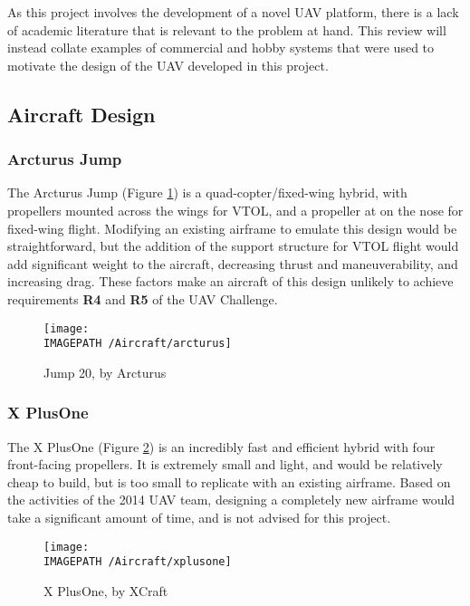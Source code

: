 As this project involves the development of a novel UAV platform, there is a lack of academic literature that is relevant to the problem at hand. This review will instead collate examples of commercial and hobby systems that were used to motivate the design of the UAV developed in this project.\\

\subsection{Aircraft Design}
\label{sec:litaircraft}
\subsubsection*{Arcturus Jump}
The Arcturus Jump\cite{ref:arcturus} (Figure \ref{fig:arcturus}) is a quad-copter/fixed-wing hybrid, with propellers mounted across the wings for VTOL, and a propeller at on the nose for fixed-wing flight. Modifying an existing airframe to emulate this design would be straightforward, but the addition of the support structure for VTOL flight would add significant weight to the aircraft, decreasing thrust and maneuverability, and increasing drag. These factors make an aircraft of this design unlikely to achieve requirements \textbf{R4} and \textbf{R5} of the UAV Challenge.

\begin{figure}[!h]
	\centering
	\texttt{[image: \\IMAGEPATH /Aircraft/arcturus]}
	\caption{Jump 20, by Arcturus}
	\label{fig:arcturus}
\end{figure}

\subsubsection*{X PlusOne}
The X PlusOne\cite{ref:xplusone} (Figure \ref{fig:xplusone}) is an incredibly fast and efficient hybrid with four front-facing propellers. It is extremely small and light, and would be relatively cheap to build, but is too small to replicate with an existing airframe. Based on the activities of the 2014 UAV team, designing a completely new airframe would take a significant amount of time, and is not advised for this project.

\begin{figure}[!ht]
	\centering
	\texttt{[image: \\IMAGEPATH /Aircraft/xplusone]}
	\caption{X PlusOne, by XCraft}
	\label{fig:xplusone}
\end{figure}

